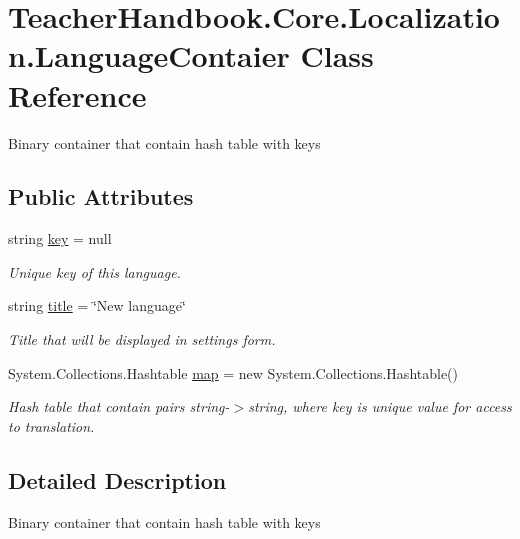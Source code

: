 \hypertarget{class_teacher_handbook_1_1_core_1_1_localization_1_1_language_contaier}{}\section{Teacher\+Handbook.\+Core.\+Localization.\+Language\+Contaier Class Reference}
\label{class_teacher_handbook_1_1_core_1_1_localization_1_1_language_contaier}


Binary container that contain hash table with keys  


\subsection*{Public Attributes}
\begin{DoxyCompactItemize}
\item 
string \mbox{\hyperlink{class_teacher_handbook_1_1_core_1_1_localization_1_1_language_contaier_a62bf6f365eec9c0b9a214a1a0d265601}{key}} = null
\begin{DoxyCompactList}\small\item\em Unique key of this language. \end{DoxyCompactList}\item 
string \mbox{\hyperlink{class_teacher_handbook_1_1_core_1_1_localization_1_1_language_contaier_a8270ebfe17630e68e74b0d99ac6480d7}{title}} = \char`\"{}New language\char`\"{}
\begin{DoxyCompactList}\small\item\em Title that will be displayed in settings form. \end{DoxyCompactList}\item 
System.\+Collections.\+Hashtable \mbox{\hyperlink{class_teacher_handbook_1_1_core_1_1_localization_1_1_language_contaier_afd80663ae6aaf8d7e1f5a6bdc658caa4}{map}} = new System.\+Collections.\+Hashtable()
\begin{DoxyCompactList}\small\item\em Hash table that contain pairs string-\/$>$string, where key is unique value for access to translation. \end{DoxyCompactList}\end{DoxyCompactItemize}


\subsection{Detailed Description}
Binary container that contain hash table with keys 



